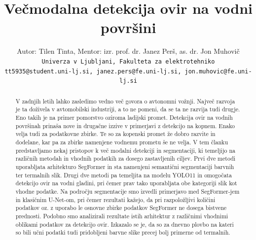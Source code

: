 \documentclass[10pt,twocolumn,letterpaper]{article}
\begin{document}
\title{Večmodalna detekcija ovir na vodni površini}

\author{Autor: Tilen Tinta, Mentor: izr. prof. dr. Janez Perš, as. dr. Jon Muhovič\\
{\tt\small Univerza v Ljubljani, Fakulteta za elektrotehniko} \\
{\tt\small tt5935@student.uni-lj.si, janez.pers@fe.uni-lj.si, jon.muhovic@fe.uni-lj.si}
}

\maketitle


\begin{abstract}
   V zadnjih letih lahko zasledimo vedno več govora o avtonomni vožnji. Največ razvoja je ta doživela v avtomobilski industriji, a to ne pomeni, da se ta ne razvija tudi drugje. Eno takih je na primer pomorstvo oziroma ladijski promet. Detekcija ovir na vodnih površinah prinaša nove in drugačne izzive v primerjavi z detekcijo na kopnem. Enako velja tudi za podatkovne zbirke. Te so za kopenski promet že dobro razvite in dodelane, kar pa za zbirke namenjene vodnemu prometu še ne velja. V tem članku predstavljamo nekaj pristopov k več modalni detekciji in segmentaciji, ki temeljijo na različnih metodah in vhodnih podatkih za dosego zastavljenih ciljev. Prvi dve metodi uporabljata arhitekturo SegFormer in sta namenjeni semantični segmentaciji barvnih ter termalnih slik. Drugi dve metodi pa temeljita na modelu YOLO11 in omogočata detekcijo ovir na vodni gladini, pri čemer prav tako uporabljata obe kategoriji slik kot vhodne podatke. Na področju segmentacije smo izvedli primerjavo med SegFormer-jem in klasičnim U-Net-om, pri čemer rezultati kažejo, da pri razpoložljivi količini podatkov oz. z uporabo le osnovne zbirke podatkov SegFormer ne dosega bistvene prednosti. Podobno smo analizirali rezultate istih arhitektur z različnimi vhodnimi oblikami podatkov za detekcijo ovir. Izkazalo se je, da so za dnevno plovbo na kateri so bili učni podatki tudi pridobljeni barvne slike precej bolj primerne od termalnih.
\end{abstract}
\end{document}
